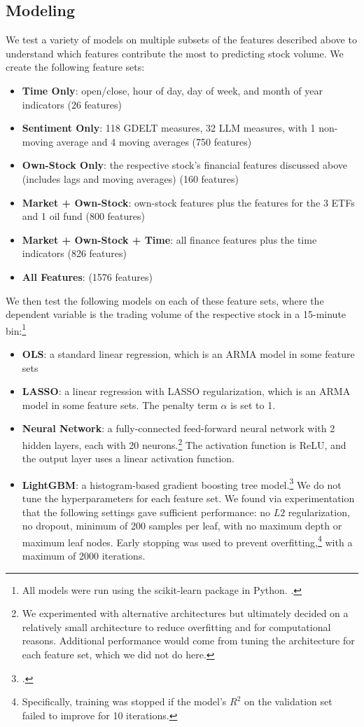 \documentclass[12pt]{article}
\begin{document}
\subsection{Modeling}

We test a variety of models on multiple subsets of the features described above to understand which features contribute the most to predicting stock volume. We create the following feature sets:
\begin{itemize}
\singlespacing
    \item \textbf{Time Only}: open/close, hour of day, day of week, and month of year indicators (26 features)
    \item \textbf{Sentiment Only}: 118 GDELT measures, 32 LLM measures, with 1 non-moving average and 4 moving averages (750 features)
    \item \textbf{Own-Stock Only}: the respective stock's financial features discussed above (includes lags and moving averages) (160 features)
    \item \textbf{Market + Own-Stock}: own-stock features plus the features for the 3 ETFs and 1 oil fund (800 features)
    \item \textbf{Market + Own-Stock + Time}: all finance features plus the time indicators (826 features)
    \item \textbf{All Features}: (1576 features)
\end{itemize}
We then test the following models on each of these feature sets, where the dependent variable is the trading volume of the respective stock in a 15-minute bin:\footnote{All models were run using the \textsf{scikit-learn} package in Python. \textcite{scikit-learn}.}
\begin{itemize}
\singlespacing
    \item \textbf{OLS}: a standard linear regression, which is an ARMA model in some feature sets
    \item \textbf{LASSO}: a linear regression with LASSO regularization, which is an ARMA model in some feature sets. The penalty term $\alpha$ is set to 1.
    \item \textbf{Neural Network}: a fully-connected feed-forward neural network with 2 hidden layers, each with 20 neurons.\footnote{We experimented with alternative architectures but ultimately decided on a relatively small architecture to reduce overfitting and for computational reasons. Additional performance would come from tuning the architecture for each feature set, which we did not do here.} The activation function is ReLU, and the output layer uses a linear activation function.
    \item \textbf{LightGBM}: a histogram-based gradient boosting tree model.\footnote{\textcite{ke2017lightgbm}.} We do not tune the hyperparameters for each feature set. We found via experimentation that the following settings gave sufficient performance: no $L2$ regularization, no dropout, minimum of 200 samples per leaf, with no maximum depth or maximum leaf nodes. Early stopping was used to prevent overfitting,\footnote{Specifically, training was stopped if the model's $R^2$ on the validation set failed to improve for 10 iterations.} with a maximum of 2000 iterations.
\end{itemize}
\end{document}
